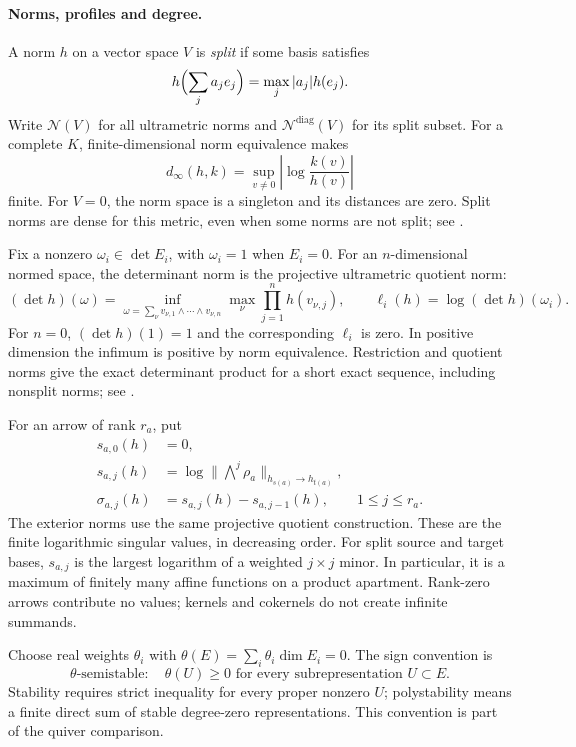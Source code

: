 \paragraph{Norms, profiles and degree.}
A norm $h$ on a vector space $V$ is \emph{split} if some basis satisfies
\[
 h\Bigl(\sum_j a_je_j\Bigr)=\max_j |a_j|h(e_j).
\]
Write $\mathcal N(V)$ for all ultrametric norms and
$\mathcal N^{\mathrm{diag}}(V)$ for its split subset. For a complete $K$,
finite-dimensional norm equivalence makes
\[
 d_\infty(h,k)=\sup_{v\ne0}\left|\log\frac{k(v)}{h(v)}\right|
\]
finite. For $V=0$, the norm space is a singleton and its distances
are zero. Split norms are dense for this metric, even when some norms are
not split; see \cite[Theorem~1.19(ii)]{BE21}.

Fix a nonzero $\omega_i\in\det E_i$, with $\omega_i=1$ when $E_i=0$.
For an $n$-dimensional normed space, the determinant norm is the
projective ultrametric quotient norm:
\[
 (\det h)(\omega)=
 \inf_{\omega=\sum_\nu v_{\nu,1}\wedge\cdots\wedge v_{\nu,n}}
       \max_\nu\prod_{j=1}^n h(v_{\nu,j}),
 \qquad \ell_i(h)=\log(\det h)(\omega_i).
\tag{50.90a}\label{eq:ch50-quiver-det}
\]
For $n=0$, $(\det h)(1)=1$ and the corresponding $\ell_i$ is zero.
In positive dimension the infimum is positive
by norm equivalence. Restriction and quotient norms give the exact
determinant product for a short exact sequence, including nonsplit norms;
see \cite[Lemma~2.8]{BE21}.

For an arrow of rank $r_a$, put
\[
 \begin{aligned}
 s_{a,0}(h)&=0,\\
 s_{a,j}(h)&=\log\|\textstyle\bigwedge^j\rho_a\|_{h_{s(a)}\to h_{t(a)}},\\
 \sigma_{a,j}(h)&=s_{a,j}(h)-s_{a,j-1}(h),\qquad 1\leq j\leq r_a.
 \end{aligned}
\tag{50.90b}\label{eq:ch50-quiver-profile}
\]
The exterior norms use the same projective quotient construction.
These are the finite logarithmic singular values, in decreasing order.
For split source and target bases, $s_{a,j}$ is the largest logarithm of
a weighted $j\times j$ minor. In particular, it is a maximum of finitely
many affine functions on a product apartment. Rank-zero arrows contribute
no values; kernels and cokernels do not create infinite summands.

Choose real weights $\theta_i$ with
$\theta(E)=\sum_i\theta_i\dim E_i=0$. The sign convention is
\[
 \theta\text{-semistable}:\quad\theta(U)\geq0
       \text{ for every subrepresentation }U\subset E.
\]
Stability requires strict inequality for every proper nonzero $U$;
polystability means a finite direct sum of stable degree-zero
representations. This convention is part of the quiver comparison.

